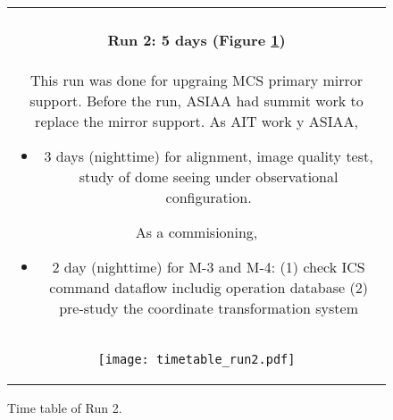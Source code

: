 \begin{figure}[!ht]
\begin{center}
\begin{tabular}{c}
\begin{minipage}{0.95\hsize}
\paragraph{Run 2: 5 days (Figure \ref{fig:run2})}
This run was done for upgraing MCS primary mirror support. 
Before the run, ASIAA had summit work to replace the mirror support. 
As AIT work y ASIAA,
	\begin{itemize}
 	\item 3 days (nighttime) for alignment, image quality test, study of dome seeing under observational configuration.
	\end{itemize}
As a commisioning,
	\begin{itemize}
 	\item 2 day (nighttime) for M-3 and M-4: 
	(1) check ICS command dataflow includig operation database
	(2) pre-study the coordinate transformation system
	\end{itemize}
\end{minipage} \\
\begin{minipage}{0.8\hsize}
	\begin{center}
	\vspace*{5mm}
	\texttt{[image: timetable\_run2.pdf]}
	\end{center}
	\vspace*{-5mm}
	\caption{Time table of Run 2.}
	\label{fig:run2}
\end{minipage}
\end{tabular}
\end{center}
\end{figure}

